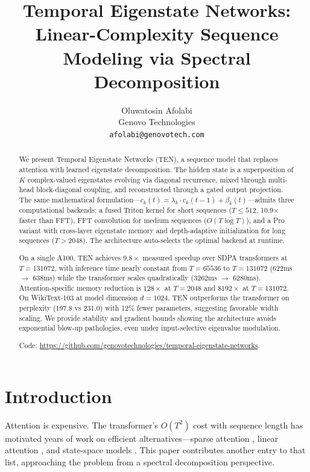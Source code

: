 \documentclass{article}
\title{Temporal Eigenstate Networks:\\Linear-Complexity Sequence Modeling via Spectral Decomposition}
\author{
  Oluwatosin Afolabi \\
  Genovo Technologies \\
  \texttt{afolabi@genovotech.com}
}
\begin{document}
\maketitle

\begin{abstract}
We present Temporal Eigenstate Networks (TEN), a sequence model that replaces attention with learned eigenstate decomposition. The hidden state is a superposition of $K$ complex-valued eigenstates evolving via diagonal recurrence, mixed through multi-head block-diagonal coupling, and reconstructed through a gated output projection. The same mathematical formulation---$c_k(t) = \lambda_k \cdot c_k(t\!-\!1) + \beta_k(t)$---admits three computational backends: a fused Triton kernel for short sequences ($T \leq 512$, 10.9$\times$ faster than FFT), FFT convolution for medium sequences ($O(T \log T)$), and a Pro variant with cross-layer eigenstate memory and depth-adaptive initialization for long sequences ($T > 2048$). The architecture auto-selects the optimal backend at runtime.

On a single A100, TEN achieves $9.8\times$ measured speedup over SDPA transformers at $T = 131072$, with inference time nearly constant from $T = 65536$ to $T = 131072$ (622ms $\to$ 638ms) while the transformer scales quadratically (3262ms $\to$ 6280ms). Attention-specific memory reduction is $128\times$ at $T = 2048$ and $8192\times$ at $T = 131072$. On WikiText-103 at model dimension $d = 1024$, TEN outperforms the transformer on perplexity (197.8 vs 231.0) with 12\% fewer parameters, suggesting favorable width scaling. We provide stability and gradient bounds showing the architecture avoids exponential blow-up pathologies, even under input-selective eigenvalue modulation.

Code: \url{https://github.com/genovotechnologies/temporal-eigenstate-networks}.
\end{abstract}


\section{Introduction}

Attention is expensive. The transformer's $O(T^2)$ cost with sequence length has motivated years of work on efficient alternatives---sparse attention \cite{child2019generating}, linear attention \cite{katharopoulos2020transformers}, and state-space models \cite{gu2021efficiently}. This paper contributes another entry to that list, approaching the problem from a spectral decomposition perspective.
\end{document}
